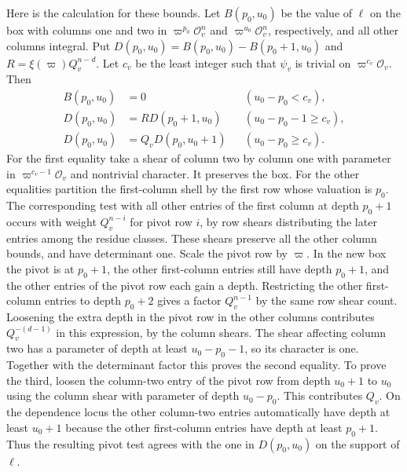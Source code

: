 Here is the calculation for these bounds. Let \(B(p_0,u_0)\) be
the value of \(\ell\) on the box with columns one and two in
\(\varpi^{p_0}\mathcal O_v^n\) and \(\varpi^{u_0}\mathcal O_v^n\),
respectively, and all other columns integral. Put
\(D(p_0,u_0)=B(p_0,u_0)-B(p_0+1,u_0)\) and
\(R=\xi(\varpi)Q_v^{n-d}\). Let \(c_v\) be the least integer
such that \(\psi_v\) is trivial on \(\varpi^{c_v}\mathcal O_v\).
Then
\begin{align*}
 B(p_0,u_0)&=0 && (u_0-p_0<c_v),\\
 D(p_0,u_0)&=R D(p_0+1,u_0) && (u_0-p_0-1\ge c_v),\\
 D(p_0,u_0)&=Q_v D(p_0,u_0+1) && (u_0-p_0\ge c_v).
\end{align*}
For the first equality take a shear of column two by column one
with parameter in \(\varpi^{c_v-1}\mathcal O_v\) and nontrivial
character. It preserves the box. For the other equalities partition
the first-column shell by the first row whose valuation is \(p_0\).
The corresponding test with all other entries of the first column
at depth \(p_0+1\) occurs with weight \(Q_v^{n-i}\) for pivot row
\(i\), by row shears distributing the later entries among the residue
classes. These shears preserve all the other column bounds, and
have determinant one. Scale the pivot row by \(\varpi\). In the
new box the pivot is at \(p_0+1\), the other first-column entries
still have depth \(p_0+1\), and the other entries of the pivot row
each gain a depth. Restricting the other first-column entries to
depth \(p_0+2\) gives a factor \(Q_v^{n-1}\) by the same row shear
count. Loosening the extra depth in the pivot row in the other
columns contributes \(Q_v^{-(d-1)}\) in this expression, by the
column shears. The shear affecting column two has a parameter of
depth at least \(u_0-p_0-1\), so its character is one. Together
with the determinant factor this proves the second equality. To
prove the third, loosen the column-two entry of the pivot row from
depth \(u_0+1\) to \(u_0\) using the column shear with parameter
of depth \(u_0-p_0\). This contributes \(Q_v\). On the dependence
locus the other column-two entries automatically have depth at
least \(u_0+1\) because the other first-column entries have depth
at least \(p_0+1\). Thus the resulting pivot test agrees with the
one in \(D(p_0,u_0)\) on the support of \(\ell\).

